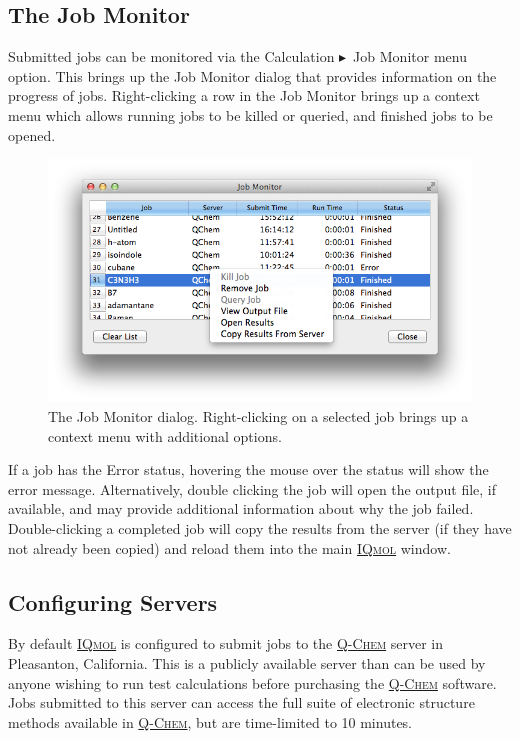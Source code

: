 \documentclass[a4paper,12pt]{article}
\newcommand{\qchem}{\href{https://q-chem.com}{{\scshape Q-Chem}}}
\newcommand{\iqmol}{\href{https://www.iqmol.org}{{\scshape IQmol}}}
\newcommand{\bt}{\ensuremath{\blacktriangleright}}
\begin{document}
\subsection{The Job Monitor}

Submitted jobs can be monitored via the Calculation \bt\ Job Monitor menu
option.  This brings up the Job Monitor dialog that provides information on the
progress of jobs.  Right-clicking a row in the Job Monitor brings up a context
menu which allows running jobs to be killed or queried, and finished jobs to be
opened.  
\begin{figure}
\begin{center}
\includegraphics[scale=0.5]{figures/JobMonitor.png} 
\caption{The Job Monitor dialog.  Right-clicking on a selected job brings up
a context menu with additional options.}
\end{center}
\end{figure}

If a job has the Error status, hovering the mouse over the status will show the
error message.  Alternatively, double clicking the job will open the output
file, if available, and may provide additional information about why the job
failed.  Double-clicking a completed job will copy the results from the
server (if they have not already been copied) and reload them into the main
\iqmol{} window.


\subsection{Configuring Servers}

By default \iqmol{} is configured to submit jobs to the \qchem{} server in
Pleasanton, California.  This is a publicly available server than can be used
by anyone wishing to run test calculations before purchasing the \qchem{}
software.  Jobs submitted to this server can access the full suite of
electronic structure methods available in \qchem{}, but are time-limited to 10
minutes. 
\end{document}
